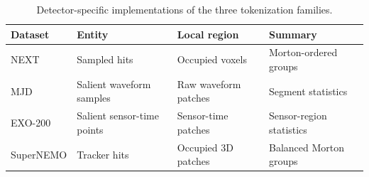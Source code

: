 \begin{table}[t]
\caption{Detector-specific implementations of the three tokenization families.}
\label{tab:tokenization-summary}
\centering
\small
\begin{tabular}{llll}
\toprule
Dataset & Entity & Local region & Summary \\
\midrule
NEXT &
Sampled hits &
Occupied voxels &
Morton-ordered groups \\

MJD &
Salient waveform samples &
Raw waveform patches &
Segment statistics \\

EXO-200 &
Salient sensor-time points &
Sensor-time patches &
Sensor-region statistics \\

SuperNEMO &
Tracker hits &
Occupied 3D patches &
Balanced Morton groups \\
\bottomrule
\end{tabular}
\end{table}